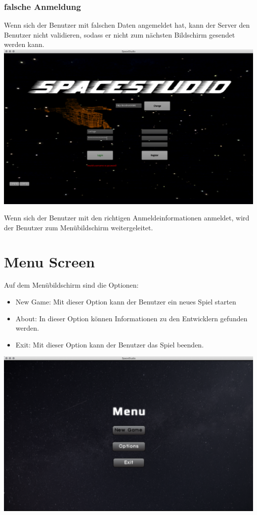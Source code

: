 \documentclass[11pt]{article}
\begin{document}
\subsubsection{ falsche Anmeldung}
Wenn sich der Benutzer mit falschen Daten angemeldet hat, kann der Server den Benutzer nicht validieren, sodass er nicht zum nächsten Bildschirm gesendet werden kann.\\
\includegraphics[scale=0.2]{TestProtocolBilder/invalidCredentials.png}

Wenn sich der Benutzer mit den richtigen Anmeldeinformationen anmeldet, wird der Benutzer zum Menübildschirm weitergeleitet.


\section{Menu Screen}
Auf dem Menübildschirm sind die Optionen:
\begin{itemize}
\item New Game: Mit dieser Option kann der Benutzer ein neues Spiel starten
\item About: In dieser Option können Informationen zu den Entwicklern gefunden werden.
\item Exit: Mit dieser Option kann der Benutzer das Spiel beenden.
\end{itemize}

\includegraphics[scale=0.2]{TestProtocolBilder/menuScreen.png}
\end{document}
